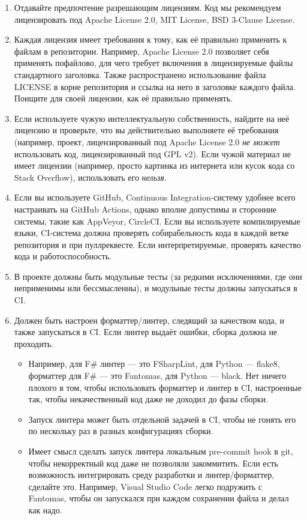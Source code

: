 \documentclass[a5paper]{article}
\begin{document}
\begin{enumerate}
    \item Отдавайте предпочтение разрешающим лицензиям. Код мы рекомендуем лицензировать под Apache License 2.0, MIT License, BSD 3-Clause License.
    \item Каждая лицензия имеет требования к тому, как её правильно применить к файлам в репозитории. Например, Apache License 2.0 позволяет себя применять пофайлово, для чего требует включения в лицензируемые файлы стандартного заголовка. Также распространено использование файла LICENSE в корне репозитория и ссылка на него в заголовке каждого файла. Поищите для своей лицензии, как её правильно применять.
    \item Если используете чужую интеллектуальную собственность, найдите на неё лицензию и проверьте, что вы действительно выполняете её требования (например, проект, лицензированный под Apache License 2.0 \emph{не может} использовать код, лицензированный под GPL v2). Если чужой материал не имеет лицензии (например, просто картинка из интернета или кусок кода со Stack Overflow), использовать его \emph{нельзя}.
    \item Если вы используете GitHub, Continuous Integration-систему удобнее всего настраивать на GitHub Actions, однако вполне допустимы и сторонние системы, такие как AppVeyor, CircleCI. Если вы используете компилируемые языки, CI-система должна проверять собирабельность кода в каждой ветке репозитория и при пуллреквесте. Если интерпретируемые, проверять качество кода и работоспособность.
    \item В проекте должны быть модульные тесты (за редкими исключениями, где они неприменимы или бессмысленны), и модульные тесты должны запускаться в CI.
    \item Должен быть настроен форматтер/линтер, следящий за качеством кода, и также запускаться в CI. Если линтер выдаёт ошибки, сборка должна не проходить.
    \begin{itemize}
        \item Например, для F\# линтер --- это FSharpLint, для Python --- flake8, форматтер для F\# --- это Fantomas, для Python --- black. Нет ничего плохого в том, чтобы использовать форматтер и линтер в CI, настроенные так, чтобы некачественный код даже не доходил до фазы сборки.
        \item Запуск линтера может быть отдельной задачей в CI, чтобы не гонять его по нескольку раз в разных конфигурациях сборки.
        \item Имеет смысл сделать запуск линтера локальным pre-commit hook в git, чтобы некорректный код даже не позволяли закоммитить. Если есть возможность интегрировать среду разработки и линтер/форматтер, сделайте это. Например, Visual Studio Code легко подружить с Fantomas, чтобы он запускался при каждом сохранении файла и делал как надо.

\end{itemize}
\end{enumerate}
\end{document}
